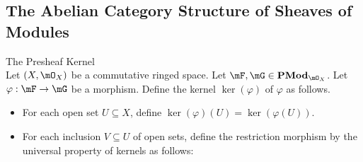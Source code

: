 \documentclass[a4paper]{article}
\begin{document}
\subsection{The Abelian Category Structure of Sheaves of Modules}
\begin{defn}{The Presheaf Kernel}{}\\
Let $(X,\mO_X)$ be a commutative ringed space. Let $\mF,\mG\in\bold{PMod}_{\mO_X}$. Let $\varphi:\mF\to\mG$ be a morphism. Define the kernel $\ker(\varphi)$ of $\varphi$ as follows. 
\begin{itemize}
\item For each open set $U\subseteq X$, define $\ker(\varphi)(U)=\ker(\varphi(U))$. 
\item For each inclusion $V\subseteq U$ of open sets, define the restriction morphism by the universal property of kernels as follows: \\
 \\~\\
\end{itemize}
\end{defn}
\end{document}
